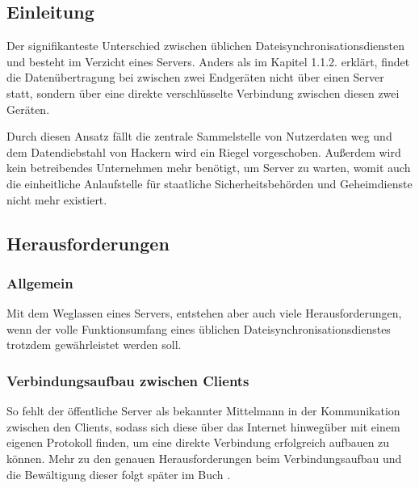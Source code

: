 \subsection{Einleitung}
Der signifikanteste Unterschied zwischen üblichen Dateisynchronisationsdiensten
und \sblit besteht im Verzicht eines Servers. Anders als im Kapitel 1.1.2. erklärt,
findet die Datenübertragung bei \sblit zwischen zwei Endgeräten nicht über einen Server statt,
sondern über eine direkte verschlüsselte Verbindung zwischen diesen zwei Geräten.

Durch diesen Ansatz fällt die zentrale Sammelstelle von Nutzerdaten
weg und dem Datendiebstahl von Hackern wird ein Riegel vorgeschoben. Außerdem
wird kein betreibendes Unternehmen mehr benötigt, um Server zu warten, womit auch
die einheitliche Anlaufstelle für staatliche Sicherheitsbehörden und Geheimdienste
nicht mehr existiert.

\subsection{Herausforderungen}
\subsubsection{Allgemein}
Mit dem Weglassen eines Servers, entstehen aber auch viele Herausforderungen,
wenn der volle Funktionsumfang eines üblichen Dateisynchronisationsdienstes
trotzdem gewährleistet werden soll.

\subsubsection{Verbindungsaufbau zwischen Clients}
So fehlt der öffentliche Server als bekannter \glqq{} Mittelmann \grqq{} in der Kommunikation
zwischen den Clients, sodass sich diese über das Internet hinwegüber mit einem
eigenen Protokoll finden, um eine direkte Verbindung erfolgreich aufbauen zu können.
Mehr zu den genauen Herausforderungen beim Verbindungsaufbau und
die Bewältigung dieser folgt später im Buch .

